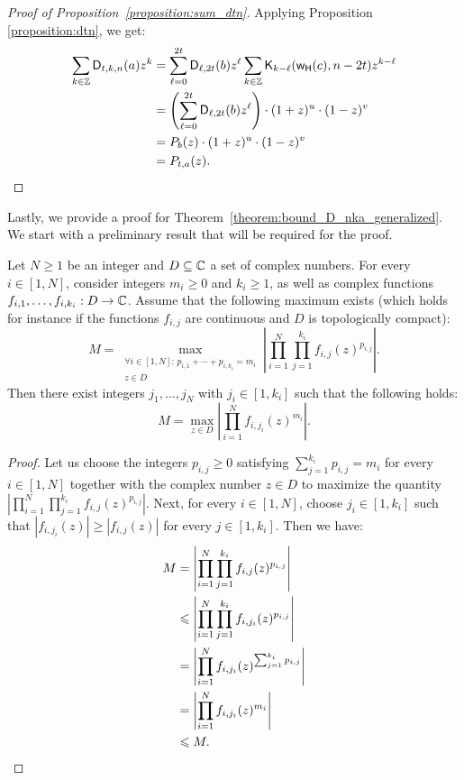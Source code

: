 \documentclass{llncs}
\begin{document}
\begin{proof}[Proof of Proposition~\ref{proposition:sum_dtn}]
    Applying Proposition \ref{proposition:dtn}, we get:
    \begin{align*}
        \sum_{k\in\Z}\Dtkna{t}{k}{n}{a}z^k&=\sum_{\ell=0}^{2t}\Dnka{2t}{\ell}{b}z^\ell\sum_{k\in\Z}\kraw{k-\ell}{\w(c)}{n-2t}z^{k-\ell}\\
        &=\left(\sum_{\ell=0}^{2t}\Dnka{2t}{\ell}{b}z^\ell\right)\cdot(1+z)^u\cdot(1-z)^v\\
        &=P_b(z)\cdot(1+z)^u\cdot(1-z)^v\\
        &=P_{t,a}(z).\qedhere
    \end{align*}
\end{proof}

Lastly, we provide a proof for Theorem~\ref{theorem:bound_D_nka_generalized}.
We start with a preliminary result that will be required for the proof.

\begin{lemma}\label{lemma:maximizing_args}
    Let $N\geq 1$ be an integer and $D\subseteq\C$ a set of complex numbers. For every $i\in[1,N]$, consider integers $m_i\geq 0$ and $k_i\geq 1$, as well as complex functions $f_{i,1},\dots,f_{i,k_i}:D\to\C$. Assume that the following maximum exists (which holds for instance if the functions $f_{i,j}$ are continuous and $D$ is topologically compact):
    \[
        M=\max_{\substack{\forall i\in[1,N]:\,p_{i,1}+\cdots+p_{i,k_i}=m_i\\z\in D}}\left|\prod_{i=1}^N\prod_{j=1}^{k_i}f_{i,j}(z)^{p_{i,j}}\right|.
    \]
    Then there exist integers $j_1,\dots,j_N$ with $j_i\in[1,k_i]$ such that the following holds:
    \[
        M=\max_{z\in D}\left|\prod_{i=1}^Nf_{i,j_i}(z)^{m_i}\right|.
    \]
\end{lemma}

\begin{proof}
    Let us choose the integers $p_{i,j}\geq 0$ satisfying $\sum_{j=1}^{k_i}p_{i,j}=m_i$ for every $i\in[1,N]$ together with the complex number $z\in D$ to maximize the quantity $\left|\prod_{i=1}^N\prod_{j=1}^{k_i}f_{i,j}(z)^{p_{i,j}}\right|$. Next, for every $i\in[1,N]$, choose $j_i\in[1,k_i]$ such that $|f_{i,j_i}(z)|\geq|f_{i,j}(z)|$ for every $j\in[1,k_i]$. Then we have:
    \begin{align*}
        M&=\left|\prod_{i=1}^N\prod_{j=1}^{k_i}f_{i,j}(z)^{p_{i,j}}\right|\\
		&\leq\left|\prod_{i=1}^N\prod_{j=1}^{k_i}f_{i,j_i}(z)^{p_{i,j}}\right|\\
		&=\left|\prod_{i=1}^Nf_{i,j_i}(z)^{\sum_{j=1}^{k_i}p_{i,j}}\right|\\
		&=\left|\prod_{i=1}^Nf_{i,j_i}(z)^{m_i}\right|\\
		&\leq M.\qedhere
    \end{align*}
\end{proof}
\end{document}
